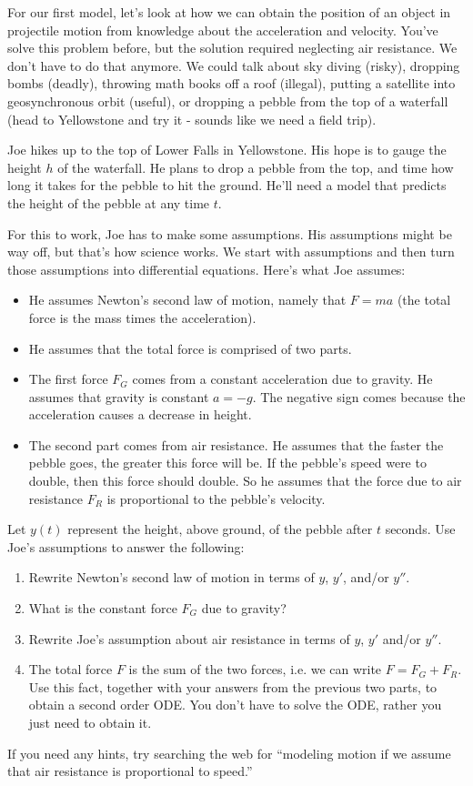 For our first model, let's look at how we can obtain the position of an object in projectile motion from knowledge about the acceleration and velocity.  You've solve this problem before, but the solution required neglecting air resistance. We don't have to do that anymore.  We could talk about sky diving (risky), dropping bombs (deadly), throwing math books off a roof (illegal), putting a satellite into geosynchronous orbit (useful), or dropping a pebble from the top of a waterfall (head to Yellowstone and try it - sounds like we need a field trip).  
\begin{problem}
 Joe hikes up to the top of Lower Falls in Yellowstone.  His hope is to gauge the height $h$ of the waterfall.  He plans to drop a pebble from the top, and time how long it takes for the pebble to hit the ground. He'll need a model that predicts the height of the pebble at any time $t$.

 For this to work, Joe has to make some assumptions.  His assumptions might be way off, but that's how science works. We start with assumptions and then turn those assumptions into differential equations. Here's what Joe assumes:
\begin{itemize}
 \item He assumes Newton's second law of motion, namely that $F=ma$ (the total force is the mass times the acceleration).
 \item He assumes that the total force is comprised of two parts.  
 \item The first force $F_G$ comes from a constant acceleration due to gravity. He assumes that gravity is constant $a=-g$. The negative sign comes because the acceleration causes a decrease in height.
 \item The second part comes from air resistance. He assumes that the faster the pebble goes, the greater this force will be. If the pebble's speed were to double, then this force should double.  So he assumes that the force due to air resistance $F_R$ is proportional to the pebble's velocity.
\end{itemize}
Let $y(t)$ represent the height, above ground, of the pebble after $t$ seconds. Use Joe's assumptions to answer the following:
\begin{enumerate}
 \item Rewrite Newton's second law of motion in terms of $y$, $y'$, and/or $y''$. 
 \item What is the constant force $F_G$ due to gravity?
 \item Rewrite Joe's assumption about air resistance in terms of $y$, $y'$ and/or $y''$. 
 \item The total force $F$ is the sum of the two forces, i.e. we can write $F = F_G+F_R$. Use this fact, together with your answers from the previous two parts, to obtain a second order ODE.  You don't have to solve the ODE, rather you just need to obtain it.
\end{enumerate}
If you need any hints, try searching the web for ``modeling motion if we assume that air resistance is proportional to speed.''
\end{problem}

